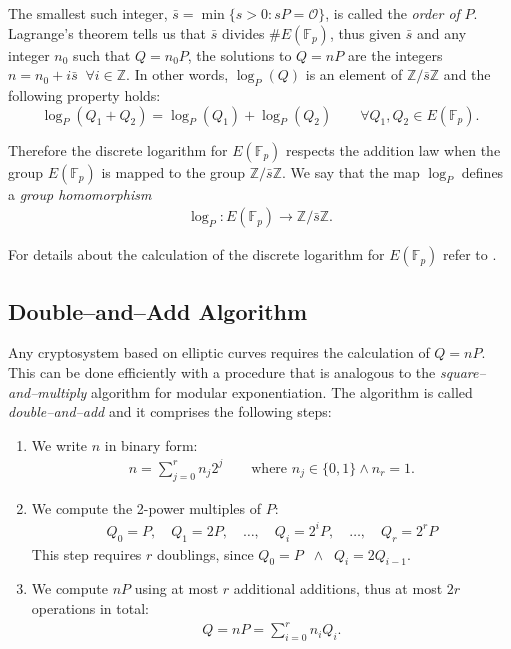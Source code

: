 \documentclass[9pt]{article}
\theoremstyle{definition}
\begin{document}
The smallest such integer, $\bar{s} = \min\{s > 0 : s P = \mathcal{O}\}$, is called the \textit{order of} $P$. Lagrange's theorem tells us that $\bar{s}$ divides $\#E(\mathbb{F}_p)$, thus given $\bar{s}$ and any integer $n_0$ such that $Q = n_0P$, the solutions to $Q = n P$ are the integers $n = n_0 + i\bar{s} \;\; \forall i \in \mathbb{Z}$. In other words, $\log_P(Q)$ is an element of $\mathbb{Z}/\bar{s}\mathbb{Z}$ and the following property holds:
$$\log_P(Q_1 + Q_2) = \log_P(Q_1) + \log_P(Q_2) \qquad \forall Q_1,Q_2 \in E(\mathbb{F}_p).$$

Therefore the discrete logarithm for $E(\mathbb{F}_p)$ respects the addition law when the group $E(\mathbb{F}_p)$ is mapped to the group $\mathbb{Z}/\bar{s}\mathbb{Z}$. We say that the map $\log_P$ defines a \textit{group homomorphism}
\begin{align*}
	\log_P : E(\mathbb{F}_p) \longrightarrow \mathbb{Z}/\bar{s}\mathbb{Z}.
\end{align*}

For details about the calculation of the discrete logarithm for $E(\mathbb{F}_p)$ refer to \cite[Example~5.15]{JH08}.

\subsection{Double--and--Add Algorithm}\label{sec:double-and-add}
Any cryptosystem based on elliptic curves requires the calculation of $Q = n P$. This can be done efficiently with a procedure that is analogous to the \textit{square--and--multiply} algorithm for modular exponentiation. The algorithm is called \textit{double--and--add} and it comprises the following steps:
\begin{enumerate}
	\item We write $n$ in binary form:
	\begin{align*}
		n = \sum_{j = 0}^{r}n_j 2^j \qquad \text{where } n_j \in \{0,1\} \wedge n_r = 1.
	\end{align*}
	\item We compute the 2-power multiples of $P$:
	\begin{align*}
	    Q_0 = P, \quad Q_1 = 2P, \quad \dots, \quad Q_i = 2^i P, \quad \dots, \quad Q_r = 2^r P
	\end{align*}
	This step requires $r$ doublings, since $Q_0 = P \;\; \wedge \;\; Q_i = 2 Q_{i-1}$.
	\item  We compute $n P$ using at most $r$ additional additions, thus at most $2r$ operations in total:
	\begin{align*}
		Q = n P = \sum_{i = 0}^{r}n_i Q_i.
	\end{align*}
\end{enumerate}
\end{document}
